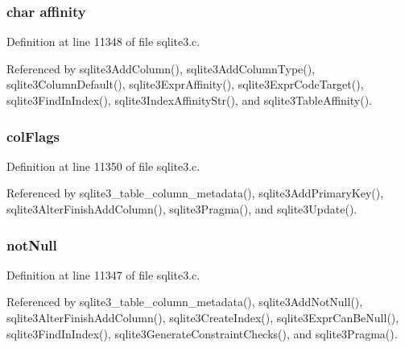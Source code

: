 \subsubsection[{affinity}]{\setlength{\rightskip}{0pt plus 5cm}char affinity}\label{struct_column_a58ce1ac60212fdb49de8a3029209e9e2}


Definition at line 11348 of file sqlite3.\+c.



Referenced by sqlite3\+Add\+Column(), sqlite3\+Add\+Column\+Type(), sqlite3\+Column\+Default(), sqlite3\+Expr\+Affinity(), sqlite3\+Expr\+Code\+Target(), sqlite3\+Find\+In\+Index(), sqlite3\+Index\+Affinity\+Str(), and sqlite3\+Table\+Affinity().

\hypertarget{struct_column_a5ff43f1aaa8353fcb6de565eac956e76}{}
\subsubsection[{col\+Flags}]{ col\+Flags}\label{struct_column_a5ff43f1aaa8353fcb6de565eac956e76}


Definition at line 11350 of file sqlite3.\+c.



Referenced by sqlite3\+\_\+table\+\_\+column\+\_\+metadata(), sqlite3\+Add\+Primary\+Key(), sqlite3\+Alter\+Finish\+Add\+Column(), sqlite3\+Pragma(), and sqlite3\+Update().

\hypertarget{struct_column_ac0fa1e50277175a94fd8bb1ccf7c18d8}{}
\subsubsection[{not\+Null}]{ not\+Null}\label{struct_column_ac0fa1e50277175a94fd8bb1ccf7c18d8}


Definition at line 11347 of file sqlite3.\+c.



Referenced by sqlite3\+\_\+table\+\_\+column\+\_\+metadata(), sqlite3\+Add\+Not\+Null(), sqlite3\+Alter\+Finish\+Add\+Column(), sqlite3\+Create\+Index(), sqlite3\+Expr\+Can\+Be\+Null(), sqlite3\+Find\+In\+Index(), sqlite3\+Generate\+Constraint\+Checks(), and sqlite3\+Pragma().

\hypertarget{struct_column_ae517aa21ac9c2666eb015bb57c8f9362}{}
